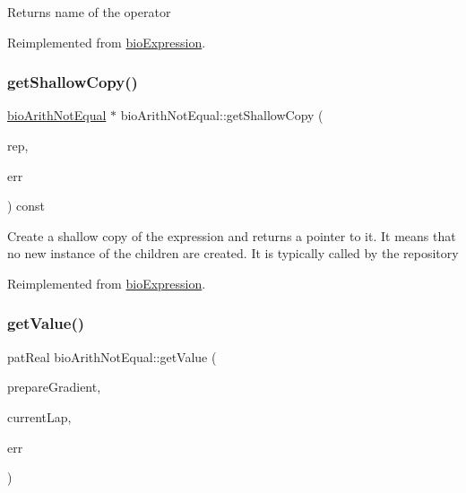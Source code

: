 \begin{DoxyReturn}{Returns}
name of the operator 
\end{DoxyReturn}


Reimplemented from \hyperlink{classbio_expression_a2353a4afb3a2b0af7c63aba086a72bde}{bio\+Expression}.

\mbox{\label{classbio_arith_not_equal_a22bcfcb7855cf992f9dc39d0911cebb5}} 
\subsubsection{\texorpdfstring{get\+Shallow\+Copy()}{getShallowCopy()}}
{\footnotesize\ttfamily \hyperlink{classbio_arith_not_equal}{bio\+Arith\+Not\+Equal} $\ast$ bio\+Arith\+Not\+Equal\+::get\+Shallow\+Copy (\begin{DoxyParamCaption}\item[{\hyperlink{classbio_expression_repository}{bio\+Expression\+Repository} $\ast$}]{rep,  }\item[{pat\+Error $\ast$\&}]{err }\end{DoxyParamCaption}) const\hspace{0.3cm}{\ttfamily [virtual]}}

Create a shallow copy of the expression and returns a pointer to it. It means that no new instance of the children are created. It is typically called by the repository 

Reimplemented from \hyperlink{classbio_expression_a442534762693b92baaf33928979a1bf8}{bio\+Expression}.

\mbox{\label{classbio_arith_not_equal_aa081815819ab133fa2fbfc87ecef0e66}} 
\subsubsection{\texorpdfstring{get\+Value()}{getValue()}}
{\footnotesize\ttfamily pat\+Real bio\+Arith\+Not\+Equal\+::get\+Value (\begin{DoxyParamCaption}\item[{pat\+Boolean}]{prepare\+Gradient,  }\item[{pat\+U\+Long}]{current\+Lap,  }\item[{pat\+Error $\ast$\&}]{err }\end{DoxyParamCaption})\hspace{0.3cm}{\ttfamily [virtual]}}

